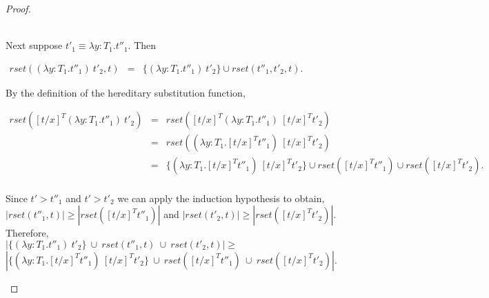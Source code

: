 \begin{proof}
\begin{itemize}
  \ \\
  Next suppose $t'_1 \equiv \lambda y:T_1.t''_1$.  Then 
  \begin{center}
    \begin{math}
      \begin{array}{lll}
        rset((\lambda y:T_1.t''_1)\ t'_2, t) & = & \{ (\lambda y:T_1.t''_1)\ t'_2\} \cup rset(t''_1, t'_2, t).
      \end{array}
    \end{math}
  \end{center}
  By the definition of the hereditary substitution function,
  \begin{center}
    \begin{math}
      \begin{array}{lll}
        rset([t/x]^T (\lambda y:T_1.t''_1)\ t'_2) & = & rset([t/x]^T (\lambda y:T_1.t''_1)\ [t/x]^T t'_2)\\
        & = & rset((\lambda y:T_1.[t/x]^T t''_1)\ [t/x]^T t'_2)\\
        & = & \{(\lambda y:T_1.[t/x]^T t''_1)\ [t/x]^T t'_2\} \cup 
        rset([t/x]^T t''_1) \cup rset([t/x]^T t'_2).\\
        
      \end{array}
    \end{math}
  \end{center}
  Since $t' > t''_1$ and $t' > t'_2$ we can apply the induction hypothesis to obtain,
  $|rset(t''_1, t)| \geq |rset([t/x]^T t''_1)|$ and $|rset(t'_2,t)| \geq |rset([t/x]^T t'_2)|$.  Therefore, \\
  $|\{ (\lambda y:T_1.t''_1)\ t'_2\}\ \cup\ rset(t''_1,t)\ \cup\ rset(t'_2,t)| \geq $ 
  $|\{(\lambda y:T_1.[t/x]^T t''_1)\ [t/x]^T t'_2\}\ \cup\ rset([t/x]^T t''_1)\ \cup\ rset([t/x]^T t'_2)|$.
  

\end{itemize}
\end{proof}

